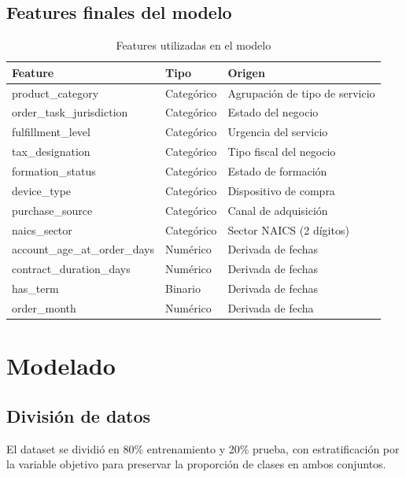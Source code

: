 \documentclass[12pt,letterpaper]{article}
\begin{document}
\subsection{Features finales del modelo}

\begin{table}[H]
\centering
\caption{Features utilizadas en el modelo}
\begin{tabular}{lll}
\toprule
\textbf{Feature} & \textbf{Tipo} & \textbf{Origen} \\
\midrule
product\_category          & Categórico & Agrupación de tipo de servicio \\
order\_task\_jurisdiction  & Categórico & Estado del negocio \\
fulfillment\_level         & Categórico & Urgencia del servicio \\
tax\_designation           & Categórico & Tipo fiscal del negocio \\
formation\_status          & Categórico & Estado de formación \\
device\_type               & Categórico & Dispositivo de compra \\
purchase\_source           & Categórico & Canal de adquisición \\
naics\_sector              & Categórico & Sector NAICS (2 dígitos) \\
account\_age\_at\_order\_days & Numérico  & Derivada de fechas \\
contract\_duration\_days   & Numérico   & Derivada de fechas \\
has\_term                  & Binario    & Derivada de fechas \\
order\_month               & Numérico   & Derivada de fecha \\
\bottomrule
\end{tabular}
\end{table}

\section{Modelado}

\subsection{División de datos}
El dataset se dividió en 80\% entrenamiento y 20\% prueba, con estratificación
por la variable objetivo para preservar la proporción de clases en ambos conjuntos.
\end{document}
